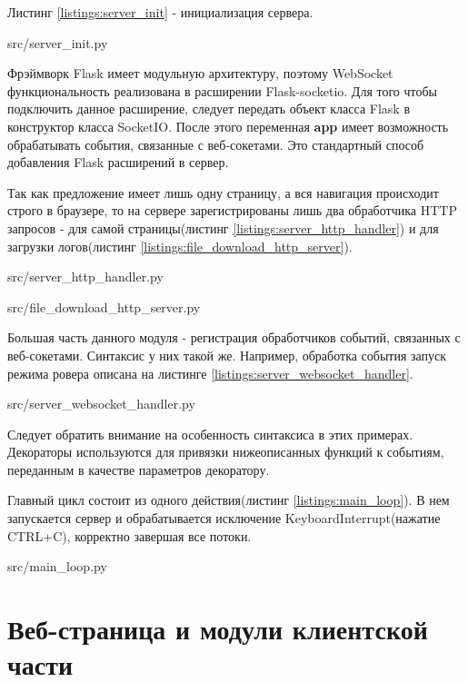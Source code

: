 Листинг \ref{listings:server_init} - инициализация сервера.


{src/server_init.py}

Фрэймворк Flask имеет модульную архитектуру, поэтому WebSocket функциональность реализована в расширении Flask-socketio. Для того чтобы подключить данное расширение, следует передать объект класса Flask в конструктор класса SocketIO. После этого переменная \textbf{app} имеет возможность обрабатывать события, связанные с веб-сокетами. Это стандартный способ добавления Flask расширений в сервер.

Так как предложение имеет лишь одну страницу, а вся навигация происходит строго в браузере, то на сервере зарегистрированы лишь два обработчика HTTP запросов - для самой страницы(листинг \ref{listings:server_http_handler}) и для загрузки логов(листинг \ref{listings:file_download_http_server}).


{src/server_http_handler.py}


{src/file_download_http_server.py}

Большая часть данного модуля - регистрация обработчиков событий, связанных с веб-сокетами. Синтаксис у них такой же. Например, обработка события запуск режима ровера описана на листинге \ref{listings:server_websocket_handler}.


{src/server_websocket_handler.py}

Следует обратить внимание на особенность синтаксиса в этих примерах. Декораторы используются для привязки нижеописанных функций к событиям, переданным в качестве параметров декоратору.

Главный цикл состоит из одного действия(листинг \ref{listings:main_loop}). В нем запускается сервер и обрабатывается исключение KeyboardInterrupt(нажатие CTRL+C), корректно завершая все потоки.


{src/main_loop.py}

\section{Веб-страница и модули клиентской части} \label{sect3_2}

